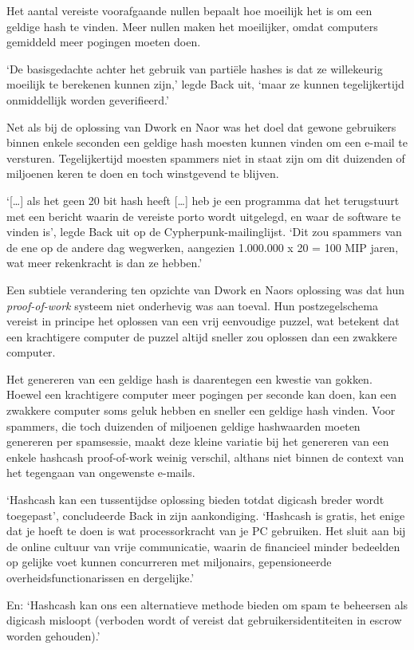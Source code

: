 \documentclass[
  a5paper,
  smalldemyvopaper,11pt,twoside,onecolumn,openright,extrafontsizes,
hidelinks]{memoir}
\begin{document}
Het aantal vereiste voorafgaande nullen bepaalt hoe moeilijk het is om
een geldige hash te vinden. Meer nullen maken het moeilijker, omdat
computers gemiddeld meer pogingen moeten doen.

`De basisgedachte achter het gebruik van partiële hashes is dat ze
willekeurig moeilijk te berekenen kunnen zijn,' legde Back uit, `maar ze
kunnen tegelijkertijd onmiddellijk worden geverifieerd.'

Net als bij de oplossing van Dwork en Naor was het doel dat gewone
gebruikers binnen enkele seconden een geldige hash moesten kunnen vinden
om een e-mail te versturen. Tegelijkertijd moesten spammers niet in
staat zijn om dit duizenden of miljoenen keren te doen en toch
winstgevend te blijven.

`{[}\ldots{]} als het geen 20 bit hash heeft {[}\ldots{]} heb je een
programma dat het terugstuurt met een bericht waarin de vereiste porto
wordt uitgelegd, en waar de software te vinden is', legde Back uit op de
Cypherpunk-mailinglijst. `Dit zou spammers van de ene op de andere dag
wegwerken, aangezien 1.000.000 x 20 = 100 MIP jaren, wat meer
rekenkracht is dan ze hebben.'

Een subtiele verandering ten opzichte van Dwork en Naors oplossing was
dat hun \emph{proof-of-work} systeem niet onderhevig was aan toeval. Hun
postzegelschema vereist in principe het oplossen van een vrij eenvoudige
puzzel, wat betekent dat een krachtigere computer de puzzel altijd
sneller zou oplossen dan een zwakkere computer.

Het genereren van een geldige hash is daarentegen een kwestie van
gokken. Hoewel een krachtigere computer meer pogingen per seconde kan
doen, kan een zwakkere computer soms geluk hebben en sneller een geldige
hash vinden. Voor spammers, die toch duizenden of miljoenen geldige
hashwaarden moeten genereren per spamsessie, maakt deze kleine variatie
bij het genereren van een enkele hashcash proof-of-work weinig verschil,
althans niet binnen de context van het tegengaan van ongewenste e-mails.

`Hashcash kan een tussentijdse oplossing bieden totdat digicash breder
wordt toegepast', concludeerde Back in zijn aankondiging. `Hashcash is
gratis, het enige dat je hoeft te doen is wat processorkracht van je PC
gebruiken. Het sluit aan bij de online cultuur van vrije communicatie,
waarin de financieel minder bedeelden op gelijke voet kunnen concurreren
met miljonairs, gepensioneerde overheidsfunctionarissen en dergelijke.'

En: `Hashcash kan ons een alternatieve methode bieden om spam te
beheersen als digicash misloopt (verboden wordt of vereist dat
gebruikersidentiteiten in escrow worden gehouden).'
\end{document}
